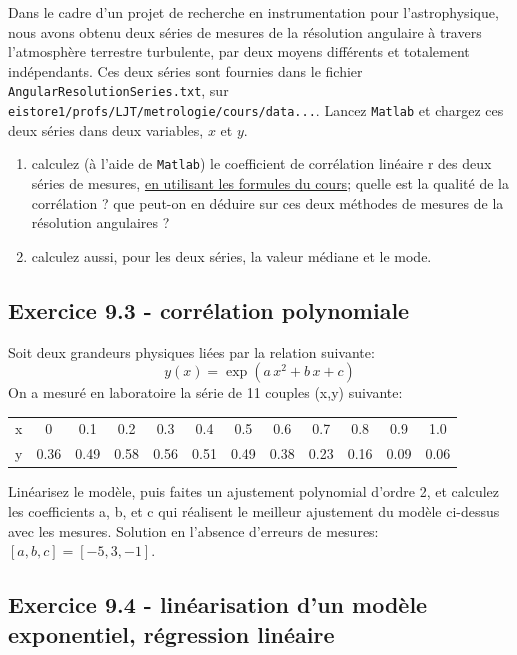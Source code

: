 Dans le cadre d'un projet de recherche en instrumentation pour l'astrophysique, nous avons obtenu deux séries de mesures de la résolution angulaire à travers l'atmosphère terrestre turbulente, par deux moyens différents et totalement indépendants. Ces deux séries sont fournies dans le fichier \texttt{AngularResolutionSeries.txt}, sur \newline
\texttt{eistore1/profs/LJT/metrologie/cours/data...}. Lancez \texttt{Matlab} et chargez ces deux séries dans deux variables, $x$ et $y$.
\begin{enumerate}
\item calculez (à l'aide de \texttt{Matlab}) le coefficient de corrélation linéaire r des deux séries de mesures, \underline{en utilisant les formules du cours}; quelle est la qualité de la corrélation ? que peut-on en déduire sur ces deux méthodes de mesures de la résolution angulaires ?
\item calculez aussi, pour les deux séries, la valeur médiane et le mode.
\end{enumerate}

\subsection*{Exercice 9.3 - corrélation polynomiale}

Soit deux grandeurs physiques liées par la relation suivante:
$$
y(x)=\exp{(a\,x^2+b\,x+c)}
$$
On a mesuré en laboratoire la série de 11 couples (x,y) suivante:
\begin{center}
\begin{tabular}{r|ccccccccccc}
x & 0 & 0.1 & 0.2 & 0.3 & 0.4 & 0.5 & 0.6 & 0.7 & 0.8 & 0.9 & 1.0\\
y & 0.36 & 0.49 & 0.58 & 0.56 & 0.51 & 0.49 & 0.38 & 0.23 & 0.16 & 0.09 & 0.06
\end{tabular}
\end{center}
Linéarisez le modèle, puis faites un ajustement polynomial d'ordre 2, et calculez les coefficients a, b, et c qui réalisent le meilleur ajustement du modèle ci-dessus avec les mesures. Solution en l'absence d'erreurs de mesures: $[a,b,c]=[-5,3,-1]$.

\subsection*{Exercice 9.4 - linéarisation d'un modèle exponentiel, régression linéaire}

